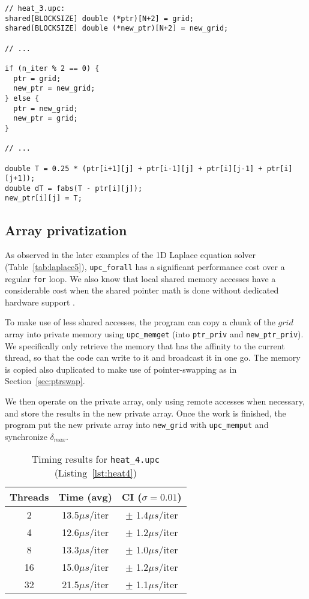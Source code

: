 \documentclass[12pt]{article}
\newcommand{\us}[0]{${\mu}s$}
\begin{document}
\begin{lstlisting}[style=C, numbers=none, caption={Excerpt from \texttt{heat\_3.upc}, where pointer-swapping was implemented}, label={lst:heat3}]
// heat_3.upc:
shared[BLOCKSIZE] double (*ptr)[N+2] = grid;
shared[BLOCKSIZE] double (*new_ptr)[N+2] = new_grid;

// ...

if (n_iter % 2 == 0) {
  ptr = grid;
  new_ptr = new_grid;
} else {
  ptr = new_grid;
  new_ptr = grid;
}

// ...

double T = 0.25 * (ptr[i+1][j] + ptr[i-1][j] + ptr[i][j-1] + ptr[i][j+1]);
double dT = fabs(T - ptr[i][j]);
new_ptr[i][j] = T;
\end{lstlisting}

\subsection{Array privatization}
\label{sec:heat4}

As observed in the later examples of the 1D Laplace equation solver (Table~\ref{tab:laplace5}), \texttt{upc\_forall} has a significant performance cost over a regular \texttt{for} loop.
We also know that local shared memory accesses have a considerable cost when the shared pointer math is done without dedicated hardware support \cite{OlivierSerres:2015}.

To make use of less shared accesses, the program can copy a chunk of the $grid$ array into private memory using \texttt{upc\_memget} (into \texttt{ptr\_priv} and \texttt{new\_ptr\_priv}).
We specifically only retrieve the memory that has the affinity to the current thread, so that the code can write to it and broadcast it in one go.
The memory is copied also duplicated to make use of pointer-swapping as in Section~\ref{sec:ptrswap}.

We then operate on the private array, only using remote accesses when necessary, and store the results in the new private array.
Once the work is finished, the program put the new private array into \texttt{new\_grid} with \texttt{upc\_memput} and synchronize $\delta_{max}$.

\begin{table}[ht]
  \centering\begin{tabular}{|c|c|c|}
    \hline
    Threads & Time (avg) & CI ($\sigma=0.01$) \\
    \hline
    2 & 13.5\us/iter & $\pm$ 1.4\us/iter \\
    4 & 12.6\us/iter & $\pm$ 1.2\us/iter \\
    8 & 13.3\us/iter & $\pm$ 1.0\us/iter \\
    16 & 15.0\us/iter & $\pm$ 1.2\us/iter \\
    32 & 21.5\us/iter & $\pm$ 1.1\us/iter \\
    \hline
  \end{tabular}
  \caption{Timing results for \texttt{heat\_4.upc} (Listing~\ref{lst:heat4})}
  \label{tab:heat4}
\end{table}
\end{document}
